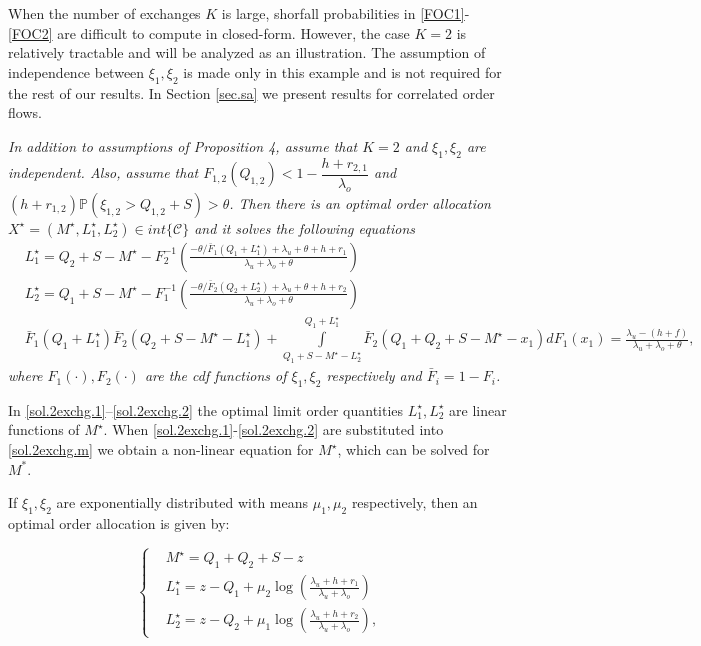 \documentclass[opre,nonblindrev]{informs3}
\begin{document}
When the number of exchanges $K$ is large, shorfall probabilities in \eqref{FOC1}-\eqref{FOC2} are difficult to compute in closed-form. However, the case $K=2$ is relatively tractable and will be analyzed as an illustration. The assumption of independence between $\xi_1,\xi_2$ is made only in this example and is not required for the rest of our results. In Section \ref{sec.sa} we present results for correlated order flows.

{\it
In addition to assumptions of Proposition 4, assume that $K=2$ and $\xi_1,\xi_2$ are independent. Also, assume that $F_{1,2}(Q_{1,2})<1-\dfrac{h+r_{2,1}}{\lambda_o}$ and $(h+r_{1,2})\mathbb{P}\left(\xi_{1,2}>Q_{1,2}+S\right) > \theta$. Then there is an optimal order allocation $X^\star=(M^{\star}, L^{\star}_1, L^{\star}_2)\in int\{\mathcal{C}\}$ and it solves the following equations
\small
\begin{subequations}
\begin{align}
& L^{\star}_1  = Q_2 + S - M^{\star} - F^{-1}_2\left(\frac{-\theta/\bar F_1(Q_1+L^{\star}_1)+\lambda_u+\theta+h+r_1}{\lambda_u+\lambda_o+\theta}\right) \label{sol.2exchg.1}\\
& L^{\star}_2  = Q_1 + S -  M^{\star} - F^{-1}_1\left(\frac{-\theta/\bar F_2(Q_2+L^{\star}_2)+\lambda_u+\theta+h+r_2}{\lambda_u+\lambda_o+\theta}\right) \label{sol.2exchg.2}\\
& \bar F_1(  Q_1+L^{\star}_1)\bar F_2(Q_2+S-  M^{\star}-L^{\star}_1)
 +\int\limits_{Q_1+ S-M^{\star}-L^{\star}_2}^{Q_1+L^{\star}_1}{\bar F_2(Q_1+Q_2+S-M^{\star}-x_1)dF_1(x_1)}= \frac{\lambda_u-(h+f)}{\lambda_u+\lambda_o+\theta}\label{sol.2exchg.m},
\end{align}
\end{subequations}
\normalsize
\noindent where $F_1(\cdot), F_2(\cdot)$ are the cdf functions of $\xi_1,\xi_2$ respectively and $\bar F_i=1-F_i$.
}


\noindent In  \eqref{sol.2exchg.1}--\eqref{sol.2exchg.2} the optimal limit order quantities $L^{\star}_1,L^{\star}_2$ are linear functions of  $M^{\star}$. When \eqref{sol.2exchg.1}-\eqref{sol.2exchg.2} are substituted into \eqref{sol.2exchg.m} we obtain a non-linear equation for $M^{\star}$, which  can be solved for $M^*$.

\iffalse
{} If $\xi_1, \xi_2$ are exponentially distributed with means $\mu_1,\mu_2$ respectively, then an optimal order allocation is given by:

\begin{equation}\label{sol.2exchg.exp_lim}
\left\{
\begin{aligned}
 &M^{\star} = Q_1+Q_2+S - z\\
 &L^{\star}_1  = z - Q_1 + \mu_2\log\left(\frac{\lambda_u+h+r_1}{\lambda_u+\lambda_o}\right) \\
 &L^{\star}_2  = z - Q_2 + \mu_1\log\left(\frac{\lambda_u+h+r_2}{\lambda_u+\lambda_o}\right),
\end{aligned}
\right.
\end{equation}
\end{document}
